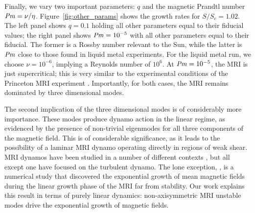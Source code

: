 \documentclass[aps,prl,reprint,superscriptaddress]{revtex4-1}
\newcommand{\SSC}{S/S_{c}}
\newcommand{\Prm}{\mbox{\textit{Pm}}}
\begin{document}
Finally, we vary two important parameters:
$q$ and the magnetic Prandtl number $\Prm = \nu/\eta$.
Figure~\ref{fig:other_params} shows the growth rates for $\SSC = 1.02$.
The left panel shows $q = 0.1$ holding all other parameters equal to their fiducial values; the right panel shows $\Prm = 10^{-5}$ with all other parameters equal to their fiducial.
The former is a Rossby number relevant to the Sun, while the latter is $\Prm$ close to those found in liquid metal experiments.
For the liquid metal run, we choose $\nu = 10^{-6}$, implying a Reynolds number of $10^6$.
At $\Prm = 10^{-5}$, the MRI is just supercritical; this is very similar to the experimental conditions of the Princeton MRI experiment \citep{2002JFM...462..365G}.
Importantly, for both cases, the MRI remains dominated by three dimensional modes.

The second implication of the three dimensional modes is of considerably more importance.
These modes produce dynamo action in the linear regime, as evidenced by the presence of non-trivial eigenmodes for all three components of the magnetic field.
This is of considerable significance, as it leads to the possibility of a laminar MRI dynamo operating directly in regions of weak shear.
MRI dynamos have been studied in a number of different contexts \citep{2007PhRvL..98y4502R,2011ApJ...740...18O,2015PhRvL.114h5002S}, but all except one have focused on the turbulent dynamo. The lone exception, \citet{2016MNRAS.462..818B}, is a numerical study that discovered the exponential growth of mean magnetic fields during the linear growth phase of the MRI far from stability.
Our work explains this result in terms of purely linear dynamics:
non-axisymmetric MRI unstable modes drive the exponential growth of magnetic fields.


\end{document}
